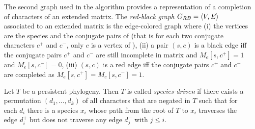 




The second graph used in the algorithm provides a representation of a  completion of characters of an extended matrix.
The \emph{red-black graph} $G_{RB}=\langle V,E \rangle$  associated to an extended matrix \me
is the edge-colored graph where (i)
the vertices are the species and the conjugate pairs of \me (that is
for each two conjugate
characters $c^{+}$ and $c^{-}$, only $c$ is a vertex of \grb), (ii) a pair $(s,c)$
is a black edge iff the conjugate pairs
$c^{+}$ and $c^{-}$ are still incomplete in matrix \me and
$M_e[s,c^{+}]=1$ and
$M_e[s,c^{-}]=0$, (iii)
$(s,c)$ is a red edge iff the conjugate pairs
$c^{+}$ and $c^{-}$ are completed as $M_e[s,c^{+}]=M_e[s,c^{-}]=1$.






\begin{definition}
\label{definition:species-driven}
Let $T$ be a persistent phylogeny.
Then $T$ is called \emph{species-driven} if there exists a permutation
$(d_{1}, \ldots , d_{k})$ of all characters that are negated in $T$
such that for each $d_{i}$ there is a species $x_{i}$ whose path from
the root of $T$ to $x_{i}$ traverses the edge $d_{i}^{+}$ but does not
traverse any edge $d_{j}^{-}$ with $j \le i$.
\end{definition}


